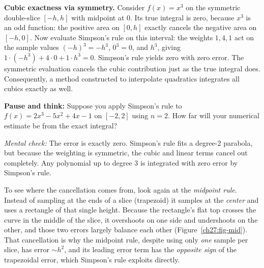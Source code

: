 \begin{intuitionbox}
\textbf{Cubic exactness via symmetry.} Consider $f(x) = x^3$ on the symmetric double-slice $[-h, h]$ with midpoint at $0$. Its true integral is zero, because $x^3$ is an odd function: the positive area on $[0,h]$ exactly cancels the negative area on $[-h,0]$. Now evaluate Simpson's rule on this interval: the weights $1,4,1$ act on the sample values $(-h)^3 = -h^3$, $0^3 = 0$, and $h^3$, giving $1\cdot(-h^3) + 4\cdot 0 + 1\cdot h^3 = 0$. Simpson's rule yields zero with zero error. The symmetric evaluation cancels the cubic contribution just as the true integral does. Consequently, a method constructed to interpolate quadratics integrates all cubics exactly as well.
\end{intuitionbox}

\begin{recoverybox}
\textbf{Pause and think:} Suppose you apply Simpson's rule to $f(x) = 2x^3 - 5x^2 + 4x - 1$ on $[-2, 2]$ using $n = 2$. How far will your numerical estimate be from the exact integral?

\emph{Mental check:} The error is exactly zero. Simpson's rule fits a degree-2 parabola, but because the weighting is symmetric, the cubic and linear terms cancel out completely. Any polynomial up to degree 3 is integrated with zero error by Simpson's rule.
\end{recoverybox}

To see where the cancellation comes from, look again at the \emph{midpoint rule}. Instead of sampling at the ends of a slice (trapezoid) it samples at the \emph{center} and uses a rectangle of that single height. Because the rectangle's flat top crosses the curve in the middle of the slice, it overshoots on one side and undershoots on the other, and those two errors largely balance each other (Figure~\ref{ch27:fig-mid}). That cancellation is why the midpoint rule, despite using only \emph{one} sample per slice, has error $\sim h^2$, and its leading error term has the \emph{opposite sign} of the trapezoidal error, which Simpson's rule exploits directly.

